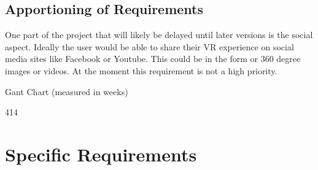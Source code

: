 \documentclass[10pt,journal,compsoc,onecolumn, draftclsnofoot]{IEEEtran}
\begin{document}
\subsection{Apportioning of Requirements}
One part of the project that will likely be delayed until later versions is the
social aspect. Ideally the user would be able to share their VR experience on
social media sites like Facebook or Youtube. This could be in the form or 360
degree images or videos. At the moment this requirement is not a high priority.

\vspace{1cm}

Gant Chart (measured in weeks)
\begin{flushright}
\begin{PstGanttChart}[ChartShowIntervals,ChartUnitIntervalName=]{3}{12}
\end{PstGanttChart}
\end{flushright}
\vspace{0.5cm}
\begin{flushright}
\begin{PstGanttChart}[ChartShowIntervals,ChartUnitIntervalName=,ChartStartInterval=13]{4}{14}
\end{PstGanttChart}
\end{flushright}

\section{Specific Requirements}
\end{document}
